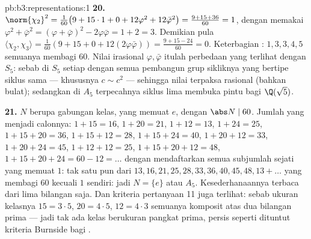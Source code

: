 \begin{solution}{pb:b3:representations:1}
\textbf{20.} $\norm{\chi_2}^2 = \frac1{60}\bigl(9 + 15\cdot1 +
0 + 12\varphi^2 + 12\bar\varphi^2\bigr) = \frac{9 + 15 +
36}{60} = 1$, dengan memakai $\varphi^2 + \bar\varphi^2 = (\varphi +
\bar\varphi)^2 - 2\varphi\bar\varphi = 1 + 2 = 3$. Demikian pula
$\langle\chi_2, \chi_3\rangle = \frac1{60}(9 + 15 + 0 +
12(2\varphi\bar\varphi)) = \frac{9 + 15 - 24}{60} = 0$.
Keterbagian : $1, 3, 3, 4, 5$ semuanya membagi $60$.
Nilai irasional $\varphi, \bar\varphi$ itulah perbedaan yang
terlihat dengan $S_5$: sebab di $S_5$ setiap  dengan
semua pembangun grup sikliknya yang bertipe siklus sama
--- khususnya $c \sim c^2$ --- sehingga nilai  terpaksa rasional (bahkan
bulat); sedangkan di $A_5$ terpecahnya
siklus lima membuka pintu bagi $\Q(\sqrt5)$.

\textbf{21.}  $N$ berupa gabungan kelas, yang
memuat $e$, dengan $\abs N \mid 60$. Jumlah yang menjadi calonnya:
$1{+}15 = 16$, $1{+}20 = 21$, $1{+}12 = 13$, $1{+}24 = 25$,
$1{+}15{+}20 = 36$, $1{+}15{+}12 = 28$, $1{+}15{+}24 = 40$,
$1{+}20{+}12 = 33$, $1{+}20{+}24 = 45$, $1{+}12{+}12 = 25$,
$1{+}15{+}20{+}12 = 48$, $1{+}15{+}20{+}24 = 60 - 12 = \dots$
dengan mendaftarkan semua subjumlah sejati yang memuat $1$: tak satu pun dari $13, 16,
21, 25, 28, 33, 36, 40, 45, 48, 13{+}\dots$ yang membagi $60$
kecuali $1$ sendiri: jadi $N = \{e\}$ atau $A_5$. Kesederhanaannya terbaca dari
lima bilangan saja. Dan kriteria pertanyaan 11 juga terlihat: sebab
ukuran kelasnya $15 = 3\cdot5$, $20 = 4\cdot5$, $12 = 4\cdot3$ semuanya
komposit atas dua bilangan prima --- jadi tak ada kelas berukuran pangkat prima, persis
seperti dituntut kriteria Burnside bagi .


\end{solution}
